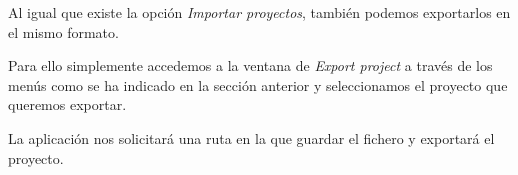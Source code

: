 Al igual que existe la opción \emph{Importar proyectos}, también podemos exportarlos en el mismo formato.

Para ello simplemente accedemos a la ventana de \emph{Export project} a través de los menús como se ha indicado en la sección anterior y seleccionamos el proyecto que queremos exportar.


La aplicación nos solicitará una ruta en la que guardar el fichero y exportará el proyecto.




